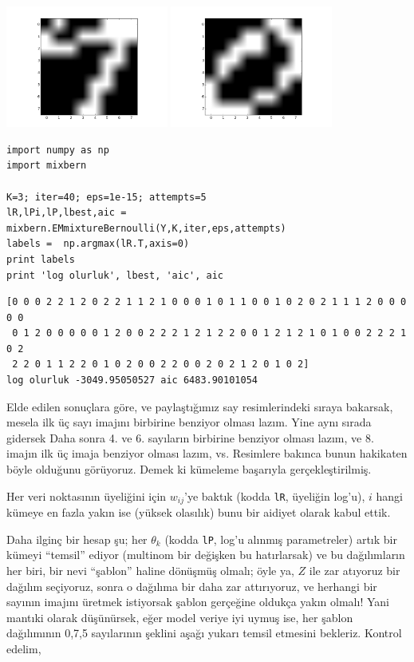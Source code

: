 \documentclass[12pt,fleqn]{article}\usepackage{../../common}
\begin{document}
\includegraphics[height=4cm]{mixbern_04.png}
\includegraphics[height=4cm]{mixbern_05.png}


\begin{verbatim}
import numpy as np
import mixbern

K=3; iter=40; eps=1e-15; attempts=5
lR,lPi,lP,lbest,aic = mixbern.EMmixtureBernoulli(Y,K,iter,eps,attempts)
labels =  np.argmax(lR.T,axis=0)
print labels
print 'log olurluk', lbest, 'aic', aic
\end{verbatim}

\begin{verbatim}
[0 0 0 2 2 1 2 0 2 2 1 1 2 1 0 0 0 1 0 1 1 0 0 1 0 2 0 2 1 1 1 2 0 0 0 0 0
 0 1 2 0 0 0 0 0 1 2 0 0 2 2 2 1 2 1 2 2 0 0 1 2 1 2 1 0 1 0 0 2 2 2 1 0 2
 2 2 0 1 1 2 2 0 1 0 2 0 0 2 2 0 0 2 0 2 1 2 0 1 0 2]
log olurluk -3049.95050527 aic 6483.90101054
\end{verbatim}

Elde edilen sonuçlara göre, ve paylaştığımız say resimlerindeki sıraya bakarsak,
mesela ilk üç sayı imajını birbirine benziyor olması lazım.  Yine aynı sırada
gidersek Daha sonra 4. ve 6. sayıların birbirine benziyor olması lazım, ve
8. imajın ilk üç imaja benziyor olması lazım, vs. Resimlere bakınca bunun
hakikaten böyle olduğunu görüyoruz. Demek ki kümeleme başarıyla
gerçekleştirilmiş.

Her veri noktasının üyeliğini için $w_{ij}$'ye baktık (kodda \verb!lR!, üyeliğin
log'u), $i$ hangi kümeye en fazla yakın ise (yüksek olasılık) bunu bir aidiyet
olarak kabul ettik.

Daha ilginç bir hesap şu; her $\theta_k$ (kodda \verb!lP!, log'u alınmış
parametreler) artık bir kümeyi ``temsil'' ediyor (multinom bir değişken bu
hatırlarsak) ve bu dağılımların her biri, bir nevi ``şablon'' haline dönüşmüş
olmalı; öyle ya, $Z$ ile zar atıyoruz bir dağılım seçiyoruz, sonra o dağılıma
bir daha zar attırıyoruz, ve herhangi bir sayının imajını üretmek istiyorsak
şablon gerçeğine oldukça yakın olmalı! Yani mantıki olarak düşünürsek, eğer
model veriye iyi uymuş ise, her şablon dağılımının 0,7,5 sayılarının şeklini
aşağı yukarı temsil etmesini bekleriz. Kontrol edelim,
\end{document}
